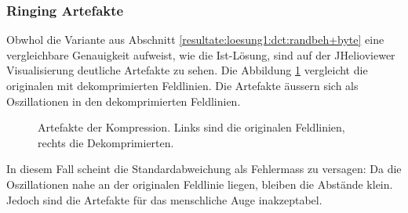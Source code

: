 \subsubsection{Ringing Artefakte}\label{resultate:loesung1:ringing}
Obwhol die Variante aus Abschnitt \ref{resultate:loesung1:dct:randbeh+byte} eine vergleichbare Genauigkeit aufweist, wie die Ist-Lösung, sind auf der JHelioviewer Visualisierung deutliche Artefakte zu sehen. Die Abbildung \ref{resultate:loesung1:dct:randbehandlung:jvhartefakte} vergleicht die originalen mit dekomprimierten Feldlinien. Die Artefakte äussern sich als Oszillationen in den dekomprimierten Feldlinien.
\begin{figure}[!htbp]
	\center
	\caption{Artefakte der Kompression. Links sind die originalen Feldlinien, rechts die Dekomprimierten.}
	\label{resultate:loesung1:dct:randbehandlung:jvhartefakte}
\end{figure} 
In diesem Fall scheint die Standardabweichung als Fehlermass zu versagen: Da die Oszillationen nahe an der originalen Feldlinie liegen, bleiben die Abstände klein. Jedoch sind die Artefakte für das menschliche Auge inakzeptabel.\\
